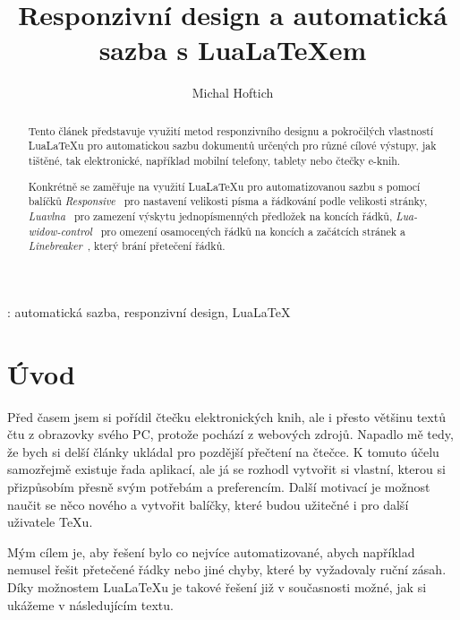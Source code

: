 \documentclass{csbulletin}
\newcommand\balicek[1]{\textit{#1}}
\newcommand\program[1]{#1}
\begin{document}
\title{Responzivní design a automatická sazba s Lua\LaTeX em}
\author{Michal Hoftich}
\maketitle

\begin{abstract}
Tento článek představuje využití metod responzivního designu a pokročilých vlastností
Lua\LaTeX u pro automatickou sazbu dokumentů určených pro různé cílové výstupy,
jak tištěné, tak elektronické, například mobilní telefony, tablety nebo čtečky e-knih.


Konkrétně se zaměřuje na využití Lua\LaTeX u pro automatizovanou
sazbu s pomocí balíčků \balicek{Responsive}~\cite{responsive} pro nastavení velikosti písma a řádkování 
podle velikosti stránky, \balicek{Luavlna}~\cite{luavlna} pro zamezení výskytu jednopísmenných předložek
na koncích řádků, \balicek{Lua-widow-control}~\cite{lua-widow-control} pro omezení osamocených řádků na koncích a
začátcích stránek a \balicek{Linebreaker}~\cite{linebreaker}, který brání přetečení řádků.

\end{abstract}
\klicovaslova: automatická sazba, responzivní design, Lua\LaTeX

\section{Úvod}

Před časem jsem si pořídil čtečku elektronických knih, ale i přesto většinu
textů čtu z obrazovky svého PC, protože pochází z webových zdrojů. 
Napadlo mě tedy, že bych si delší články ukládal pro pozdější
přečtení na čtečce. K tomuto účelu samozřejmě existuje řada aplikací, ale 
já se rozhodl vytvořit si vlastní, kterou si přizpůsobím přesně svým potřebám
a preferencím. Další motivací je možnost naučit se něco nového a vytvořit
balíčky, které budou užitečné i pro další uživatele \TeX u. 

Mým cílem je, aby řešení bylo co nejvíce automatizované, abych například nemusel
řešit přetečené řádky nebo jiné chyby, které by vyžadovaly ruční zásah. 
Díky možnostem Lua\LaTeX u je takové řešení již v současnosti možné, 
jak si ukážeme v následujícím textu.


\end{document}
